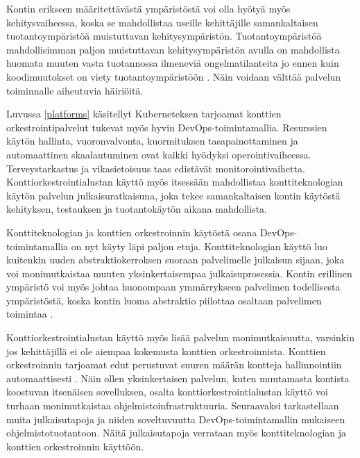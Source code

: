 Kontin erikseen määritettävästä ympäristöstä voi olla hyötyä myös kehitysvaiheessa, koska se mahdollistaa useille kehittäjille samankaltaisen tuotantoympäristöä muistuttavan kehitysympäristön.
Tuotantoympäristöä mahdollisimman paljon muistuttavan kehitysympäristön avulla on mahdollista huomata muuten vasta tuotannossa ilmeneviä ongelmatilanteita jo ennen kuin koodimuutokset on viety tuotantoympäristöön \cite{Narasimhulu23}.
Näin voidaan välttää palvelun toiminnalle aiheutuvia häiriöitä.

Luvussa \ref{platforms} käsitellyt Kuberneteksen tarjoamat konttien orkestrointipalvelut tukevat myös hyvin DevOps-toimintamallia.
Resurssien käytön hallinta, vuoronvalvonta, kuormituksen tasapainottaminen ja automaattinen skaalautuminen ovat kaikki hyödyksi operointivaiheessa.
Terveystarkastus ja vikasietoisuus taas edistävät monitorointivaihetta.
Konttiorkestrointialustan käyttö myös itsessään mahdollistaa konttiteknologian käytön palvelun julkaisuratkaisuna, joka tekee samankaltaisen kontin käytöstä kehityksen, testauksen ja tuotantokäytön aikana mahdollista.

Konttiteknologian ja konttien orkestroinnin käytöstä osana DevOps-toimintamallia on nyt käyty läpi paljon etuja.
Konttiteknologian käyttö luo kuitenkin uuden abstraktiokerroksen suoraan palvelimelle julkaisun sijaan, joka voi monimutkaistaa muuten yksinkertaisempaa julkaisuprosessia.
Kontin erillinen ympäristö voi myös johtaa huonompaan ymmärrykseen palvelimen todellisesta ympäristöstä, koska kontin luoma abstraktio piilottaa osaltaan palvelimen toimintaa \cite{Mikkonen22}.

Konttiorkestrointialustan käyttö myös lisää palvelun monimutkaisuutta, varsinkin jos kehittäjillä ei ole aiempaa kokemusta konttien orkestroinnista.
Konttien orkestroinnin tarjoamat edut perustuvat suuren määrän kontteja hallinnointiin automaattisesti \cite{Khan17}.
Näin ollen yksinkertaisen palvelun, kuten muutamasta kontista koostuvan itsenäisen sovelluksen, osalta konttiorkestrointialustan käyttö voi turhaan monimutkaistaa ohjelmistoinfrastruktuuria.
Seuraavaksi tarkastellaan muita julkaisutapoja ja niiden soveltuvuutta DevOps-toimintamallin mukaiseen ohjelmistotuotantoon.
Näitä julkaisutapoja verrataan myös konttiteknologian ja konttien orkestroinnin käyttöön.
